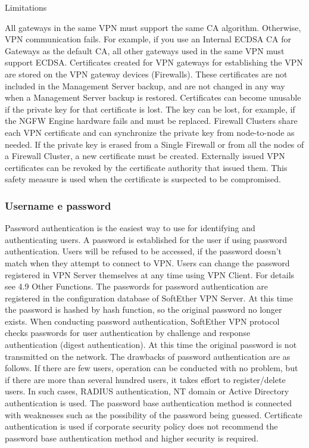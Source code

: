 Limitations

All gateways in the same VPN must support the same CA algorithm. Otherwise, VPN communication fails. For example, if you use an Internal ECDSA CA for Gateways as the default CA, all other gateways used in the same VPN must support ECDSA.
Certificates created for VPN gateways for establishing the VPN are stored on the VPN gateway devices (Firewalls). These certificates are not included in the Management Server backup, and are not changed in any way when a Management Server backup is restored.
Certificates can become unusable if the private key for that certificate is lost. The key can be lost, for example, if the NGFW Engine hardware fails and must be replaced. Firewall Clusters share each VPN certificate and can synchronize the private key from node-to-node as needed. If the private key is erased from a Single Firewall or from all the nodes of a Firewall Cluster, a new certificate must be created.
Externally issued VPN certificates can be revoked by the certificate authority that issued them. This safety measure is used when the certificate is suspected to be compromised.

\subsubsection{Username e password}
Password authentication is the easiest way to use for identifying and authenticating users. A password is established for the user if using password authentication.
Users will be refused to be accessed, if the password doesn't match when they attempt to connect to VPN. Users can change the password registered in VPN Server themselves at any time using VPN Client. For details see 4.9 Other Functions.
The passwords for password authentication are registered in the configuration database of SoftEther VPN Server. At this time the password is hashed by hash function, so the original password no longer exists. When conducting password authentication, SoftEther VPN protocol checks passwords for user authentication by challenge and response authentication (digest authentication). At this time the original password is not transmitted on the network.
The drawbacks of password authentication are as follows.
If there are few users, operation can be conducted with no problem, but if there are more than several hundred users, it takes effort to register/delete users. In such cases, RADIUS authentication, NT domain or Active Directory authentication is used.
The password base authentication method is connected with weaknesses such as the possibility of the password being guessed. Certificate authentication is used if corporate security policy does not recommend the password base authentication method and higher security is required.


